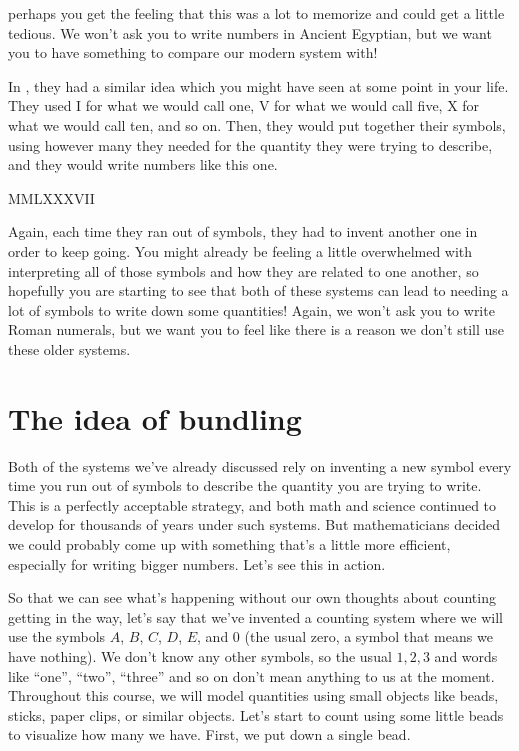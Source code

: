 \documentclass{ximera}
\begin{document}
perhaps you get the feeling that this was a lot to memorize and could get a little tedious. We won't ask you to write numbers in Ancient Egyptian, but we want you to have something to compare our modern system with!

In , they had a similar idea which you might have seen at some point in your life. They used I for what we would call one, V for what we would call five, X for what we would call ten, and so on. Then, they would put together their symbols, using however many they needed for the quantity they were trying to describe, and they would write numbers like this one. 

\begin{image}
MMLXXXVII
\end{image}

Again, each time they ran out of symbols, they had to invent another one in order to keep going. You might already be feeling a little overwhelmed with interpreting all of those symbols and how they are related to one another, so hopefully you are starting to see that both of these systems can lead to needing a lot of symbols to write down some quantities! Again, we won't ask you to write Roman numerals, but we want you to feel like there is a reason we don't still use these older systems.

\section{The idea of bundling}

Both of the systems we've already discussed rely on inventing a new symbol every time you run out of symbols to describe the quantity you are trying to write. This is a perfectly acceptable strategy, and both math and science continued to develop for thousands of years under such systems. But mathematicians decided we could probably come up with something that's a little more efficient, especially for writing bigger numbers. Let's see this in action.

So that we can see what's happening without our own thoughts about counting getting in the way, let's say that we've invented a counting system where we will use the symbols $A$, $B$, $C$, $D$, $E$, and $0$ (the usual zero, a symbol that means we have nothing). We don't know any other symbols, so the usual $1, 2, 3$ and words like ``one'', ``two'', ``three'' and so on don't mean anything to us at the moment. Throughout this course, we will model quantities using small objects like beads, sticks, paper clips, or similar objects. Let's start to count using some little beads to visualize how many we have. First, we put down a single bead.
\end{document}
